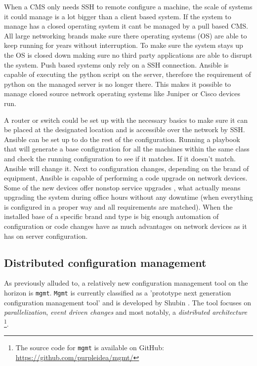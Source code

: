 When a CMS only needs SSH to remote configure a machine, the scale of systems it could manage is a lot bigger than a client based system. If the system to manage has a closed operating system it cant be managed by a pull based CMS. All large networking brands make sure there operating systems (OS) are able to keep running for years without interruption. To make sure the system stays up the OS is closed down making sure no third party applications are able to disrupt the system. Push based systems only rely on a SSH connection. Ansible is capable of executing the python script on the server, therefore the requirement of python on the managed server is no longer there. This makes it possible to manage closed source network operating systems like Juniper or Cisco devices run. 

A router or switch could be set up with the necessary basics to make sure it can be placed at the designated location and is accessible over the network by SSH. Ansible can be set up to do the rest of the configuration. Running a playbook that will generate a base configuration for all the machines within the same class and check the running configuration to see if it matches. If it doesn't match. Ansible will change it. Next to configuration changes, depending on the brand of equipment, Ansible is capable of performing a code upgrade on network devices. Some of the new devices offer nonstop service upgrades \cite{NSSU}\cite{ISSU}, what actually means upgrading the system during office hours without any downtime (when everything is configured in a proper way and all requirements are matched). When the installed base of a specific brand and type is big enough automation of configuration or code changes have as much advantages on network devices as it has on server configuration.  

\subsection{Distributed configuration management}\label{subsec:distributedmgmt}
As previously alluded to, a relatively new configuration management tool on the horizon is \texttt{mgmt}. \texttt{Mgmt} is currently classified as a 'prototype next generation configuration management tool' and is developed by Shubin \cite{shubin2016}. The tool focuses on \textit{parallelization}, \textit{event driven changes} and most notably, a \textit{distributed architecture} \footnote{The source code for \texttt{mgmt} is available on GitHub: \url{https://github.com/purpleidea/mgmt/}}. 

